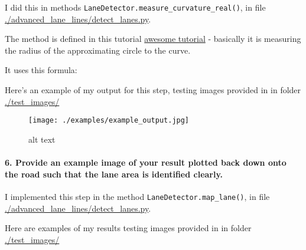 \documentclass[11pt]{article}
\makeatletter
\def\maxwidth{\ifdim\Gin@nat@width>\linewidth\linewidth
    \else\Gin@nat@width\fi}
\let\Oldincludegraphics\includegraphics
\renewcommand{\includegraphics}[1]{\Oldincludegraphics[width=.8\maxwidth]{#1}}
\makeatother
\begin{document}
I did this in methods \texttt{LaneDetector.measure\_curvature\_real()},
in file
\href{./advanced-lane-lines/detect-lanes.py}{./advanced\_lane\_lines/detect\_lanes.py}.

The method is defined in this tutorial
\href{https://www.intmath.com/applications-differentiation/8-radius-curvature.php}{awesome
tutorial} - basically it is measuring the radius of the approximating
circle to the curve.

It uses this formula:

Here's an example of my output for this step, testing images provided in
in folder \href{./test_images}{./test\_images/}

    \begin{figure}
\centering
\texttt{[image: ./examples/example\_output.jpg]}
\caption{alt text}
\end{figure}

\hypertarget{provide-an-example-image-of-your-result-plotted-back-down-onto-the-road-such-that-the-lane-area-is-identified-clearly.}{%
\paragraph{6. Provide an example image of your result plotted back down
onto the road such that the lane area is identified
clearly.}\label{provide-an-example-image-of-your-result-plotted-back-down-onto-the-road-such-that-the-lane-area-is-identified-clearly.}}

I implemented this step in the method \texttt{LaneDetector.map\_lane()},
in file
\href{./advanced-lane-lines/detect-lanes.py}{./advanced\_lane\_lines/detect\_lanes.py}.

Here are examples of my results testing images provided in in folder
\href{./test_images}{./test\_images/}
\end{document}
